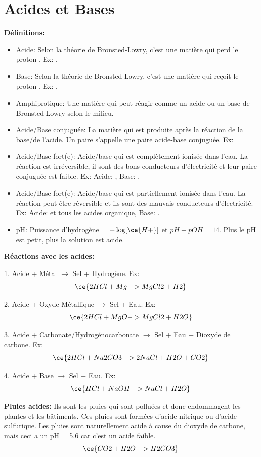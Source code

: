 \documentclass[french, a4paper, 12pt]{article}
\newcommand*\cec[1]{\cesplit{{\,\ }{\0}}{#1}} %
\begin{document}
\section{Acides et Bases}
\textbf{Définitions:}
\begin{itemize}
\item Acide: Selon la théorie de Bronsted-Lowry, c'est une matière qui perd le proton . Ex: \cec{HCl, HCO3, H2SO4}.
\item Base: Selon la théorie de Bronsted-Lowry, c'est une matière qui reçoit le proton . Ex: \cec{NaOH, KOH, NH4OH}.
\item Amphiprotique: Une matière qui peut réagir comme un acide ou un base de Bronsted-Lowry selon le milieu.
\item Acide/Base conjuguée: La matière qui est produite après la réaction de la base/de l'acide. Un paire s'appelle une paire acide-base conjuguée. Ex: 
\item Acide/Base fort(e): Acide/base qui est complètement ionisée dans l'eau. La réaction est irréversible, il sont des bons conducteurs d'électricité et leur paire conjuguée est faible. Ex: Acide: , Base: .
\item Acide/Base fort(e): Acide/base qui est partiellement ionisée dans l'eau. La réaction peut être réversible et ils sont des mauvais conducteurs d'électricité. Ex: Acide:  et tous les acides organique, Base: .
\item pH: Puissance d'hydrogène = $-\log[\ce{H+}]$ et $pH + pOH = 14$. Plus le pH est petit, plus la solution est acide.
\end{itemize}

\vspace{0.5em}
\textbf{Réactions avec les acides:}

\begin{center}
1. Acide + Métal $\rightarrow$ Sel + Hydrogène. Ex:
\[
\ce{2HCl + Mg -> MgCl2 + H2}
\]

2. Acide + Oxyde Métallique $\rightarrow$ Sel + Eau. Ex:
\[
\ce{2HCl + MgO -> MgCl2 + H2O}
\]

3. Acide + Carbonate/Hydrogénocarbonate $\rightarrow$ Sel + Eau + Dioxyde de carbone. Ex:
\[
\ce{2HCl + Na2CO3 -> 2NaCl + H2O + CO2}
\]

4. Acide + Base $\rightarrow$ Sel + Eau. Ex:
\[
\ce{HCl + NaOH -> NaCl + H2O}
\]
\end{center}

\vspace{0.5em}
\textbf{Pluies acides:}
Ils sont les pluies qui sont polluées et donc endommagent les plantes et les bâtiments. Ces pluies sont formées d'acide nitrique ou d'acide sulfurique. Les pluies sont naturellement acide à cause du dioxyde de carbone, mais ceci a un pH = 5.6 car c'est un acide faible.
\[
\ce{CO2 + H2O -> H2CO3}
\]
\end{document}
